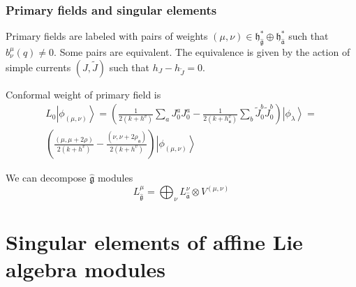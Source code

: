 \documentclass[pdftex]{beamer}
\newcommand{\gf}{\mathfrak{g}}
\newcommand{\gfh}{\hat{\mathfrak{g}}}
\newcommand{\af}{\mathfrak{a}}
\newcommand{\afh}{\hat{\mathfrak{a}}}
\newcommand{\bff}{\mathfrak{b}}
\newcommand{\hf}{\mathfrak{h}}
\theoremstyle{definition} \newtheorem{Def}{Definition}
\begin{document}
\begin{frame}
  \frametitle{Primary fields and singular elements}
  Primary fields are labeled with pairs of weights $(\mu,\nu)\in \hf_{\gfh}^{*}\oplus \hf_{\afh}^{*}$ such that  $b^{\mu}_{\nu}(q)\neq 0$. Some pairs are equivalent. The equivalence is given by the  action of simple currents $(J,\tilde{J})$ such that $h_{J}-h_{\tilde{J}}=0$. 

  Conformal weight of primary field is
  \begin{multline}
    L_0\left|\phi_{(\mu,\nu)}\right>=\left(\frac{1}{2(k+h^v)}\sum_aJ^a_0J^a_0-\frac{1}{2(k+h_{\af}^v)}\sum_b \tilde{J}^b_0 \tilde{J}^b_0 \right)
    \left|\phi_{\lambda}\right>=\\
    \left(\frac{(\mu,\mu+2\rho)}{2(k+h^v)}-\frac{(\nu,\nu+2\rho_{\af})}{2(k+h^v)}\right)\left|\phi_{(\mu,\nu)}\right>
  \end{multline}

  We can decompose $\gfh$ modules
  \begin{equation*}
    L^{\mu}_{\gfh}=\bigoplus_{\nu} L^{\nu}_{\afh}\otimes V^{(\mu,\nu)}
  \end{equation*}
  
\end{frame}


\section{Singular elements of affine Lie algebra modules}
\end{document}

